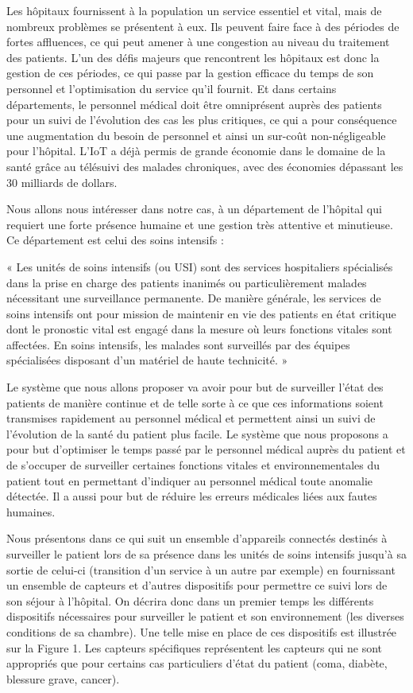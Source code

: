 \documentclass{article}
\begin{document}
 Les hôpitaux fournissent à la population un service essentiel et vital, mais de nombreux problèmes se présentent à eux. Ils peuvent faire face à des périodes de fortes affluences, ce qui peut amener à une congestion au niveau du traitement des patients. L’un des défis majeurs que rencontrent les hôpitaux est donc la gestion de ces périodes, ce qui passe par la gestion efficace du temps de son personnel et l’optimisation du service qu’il fournit. Et dans certains départements, le personnel médical doit être omniprésent auprès des patients pour un suivi de l’évolution des cas les plus critiques, ce qui a pour conséquence une augmentation du besoin de personnel et ainsi un sur-coût non-négligeable pour l’hôpital. L'IoT a déjà permis de grande économie dans le domaine de la santé grâce au télésuivi des malades chroniques, avec des économies dépassant les 30 milliards de dollars.\cite{OrangeHealthCare}
 
 Nous allons nous intéresser dans notre cas, à un département de l’hôpital qui requiert une forte présence humaine et une gestion très attentive et minutieuse. Ce département est celui des soins intensifs :
 
 « Les unités de soins intensifs (ou USI) sont des services hospitaliers spécialisés dans la prise en charge des patients inanimés ou particulièrement malades nécessitant une surveillance permanente. De manière générale, les services de soins intensifs ont pour mission de maintenir en vie des patients en état critique dont le pronostic vital est engagé dans la mesure où leurs fonctions vitales sont affectées. En soins intensifs, les malades sont surveillés par des équipes spécialisées disposant d'un matériel de haute technicité. » \cite{SoinsIntensifs}

Le système que nous allons proposer va avoir pour but de surveiller l’état des patients de manière continue et de telle sorte à ce que ces informations soient transmises rapidement au personnel médical et permettent ainsi un suivi de l’évolution de la santé du patient plus facile. Le système que nous proposons a pour but d’optimiser le temps passé par le personnel médical auprès du patient et de s’occuper de surveiller certaines fonctions vitales et environnementales du patient tout en permettant d’indiquer au personnel médical toute anomalie détectée. Il a aussi pour but de réduire les erreurs médicales liées aux fautes humaines. 

Nous présentons dans ce qui suit un ensemble d’appareils connectés destinés à surveiller le patient lors de sa présence dans les unités de soins intensifs jusqu'à sa sortie de celui-ci (transition d’un service à un autre par exemple) en fournissant un ensemble de capteurs et d’autres dispositifs pour permettre ce suivi lors de son séjour à l’hôpital. On décrira donc dans un premier temps les différents dispositifs nécessaires pour surveiller le patient et son environnement (les diverses conditions de sa chambre). Une telle mise en place de ces dispositifs est illustrée sur la Figure 1. Les capteurs spécifiques représentent les capteurs qui ne sont appropriés que pour certains cas particuliers d’état du patient (coma, diabète, blessure grave, cancer).
\end{document}

